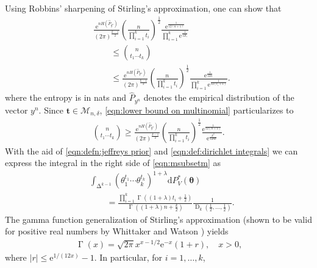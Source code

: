 \documentclass[journal, 10pt]{IEEEtran}
\newcommand{\rmd}{\mathrm{d}}
\newcommand{\rme}{\mathrm{e}}
\newcommand{\cM}{\mathcal{M}}
\theoremstyle{plain}
\theoremstyle{plain}
\theoremstyle{plain}
\theoremstyle{plain}
\newcommand{\boldtheta}{\mathbold{\theta}}
\newcommand{\boldt}{\mathbold{t}}
\newcommand{\opD}{\operatorname{D}}
\newcommand{\opGamma}{\operatorname{\Gamma}}
\newcommand{\simplex}{\operatorname{\Delta}}
\begin{document}
Using Robbins' sharpening \cite{Robbins} of Stirling's approximation, one can show that
\begin{align}
&\frac{\rme^{nH(\widehat{P}_{y^n})}}{(2\pi)^{\frac{k-1}{2}}} \left(\frac{n}{\prod_{i=1}^k t_i}\right)^\frac12 
\frac{\rme^{\frac{1}{12(n+1)}}}{\prod_{i=1}^{k} \rme^{\frac{1}{12t_i}}} \nonumber \\
&\qquad \le \binom{n}{t_1 \cdots t_k } \label{eqn:lower bound on multinomial} \\
&\qquad \le \frac{\rme^{nH(\widehat{P}_{y^n})}}{(2\pi)^{\frac{k-1}{2}} } \left(\frac{n}{\prod_{i=1}^{k}t_i}\right)^\frac12
\frac{\rme^{\frac{1}{12n}}}{\prod_{i=1}^{k}\rme^{\frac{1}{12(t_i+1)}} } \text{.} \label{eqn:upper bound on multinomial}
\end{align}
where the entropy is in nats and $\widehat{P}_{y^n}$ denotes the empirical distribution of the vector $y^n$. Since $ \boldt \in \cM_{n, \delta}$, \eqref{eqn:lower bound on multinomial} particularizes to 
\begin{align}
	\binom{n}{t_1 \cdots t_k } \ge \frac{\rme^{nH(\widehat{P}_{y^n})}}{(2\pi)^{\frac{k-1}{2}}} \left(\frac{n}{\prod_{i=1}^k t_i}\right)^\frac12  
\frac{\rme^{\frac{1}{12(n+1)}}}{ \rme^{\frac{k^2}{12n\delta }}}\text{.} \label{eqn:low_bd_on_multinom}
\end{align}
With the aid of \eqref{eqn:defn:jeffreys prior} and \eqref{eqn:def:dirichlet integrals} we can express the integral in the right side of \eqref{eqn:msubsetm} as
\begin{align}
&\int_{\simplex^{k-1}}\left(\theta_1^{t_1}\cdots\theta_k^{t_k}\right)^{1+\lambda}\rmd P^*_{V}(\boldtheta) \nonumber \\
&\qquad = \frac{\prod_{i=1}^k\opGamma\left((1+\lambda)t_i+\frac 12\right)}{\opGamma\left((1+\lambda)n+\frac k2\right)}   \frac{1}{\opD_k\left(\frac12, \hdots, \frac12\right)} \text{.} \label{eqn:from_dirichletevaluate}
\end{align}
The gamma function generalization of Stirling's approximation (shown to be valid for positive real numbers by Whittaker and Watson \cite{Whittaker}) yields
\begin{align}
\opGamma(x)=\sqrt{2\pi}x^{x-1/2}\rme^{-x}(1+r), \quad x>0\text{,} \label{eqn:Stirling_Approximation_for_Gamma_Function}
\end{align}
where $|r|\leq \rme^{1/(12x)}-1$. In particular, for $i=1,\hdots,  k $,
\end{document}
